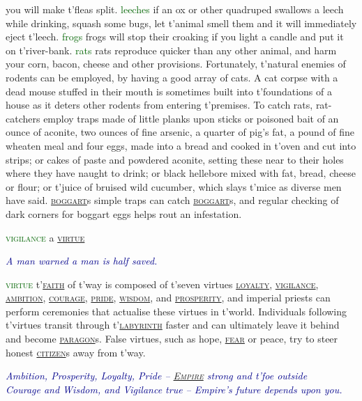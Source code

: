 \documentclass[twoside,11pt,b5paper,twocolumn]{scrbook}
\newcommand{\estcab}[1]{\textsc{\textcolor{marron}{#1}}}
\newcommand{\keyword}[1]{\textcolor{darkgreen}{#1}}
\renewcommand{\paragraph}[1]{\par\noindent\markboth{#1}{#1}\estcab{\keyword{#1}}\label{#1} }
\newcommand{\see}[1]{{\estcab{\hyperref[#1]{#1}}}}
\newcommand{\proverb}[1]{\par \textcolor{darkblue}{\itshape #1}}
\begin{document}
you will make t'fleas split. \keyword{leeches} if an ox or other quadruped swallows a leech while drinking, squash some bugs, let t'animal smell them and it will immediately eject t'leech. \keyword{frogs} frogs will stop their croaking if you light a candle and put it on t'river-bank. \keyword{rats} rats reproduce quicker than any other animal, and harm your corn, bacon, cheese and other provisions. Fortunately, t'natural enemies of rodents can be employed, by having a good array of cats. A cat corpse with a dead mouse stuffed in their mouth is sometimes built into t'foundations of a house as it deters other rodents from entering t'premises. To catch rats, rat-catchers employ traps made of little planks upon sticks or poisoned bait of an ounce of aconite, two ounces of fine arsenic, a quarter of pig's fat, a pound of fine wheaten meal and four eggs, made into a bread and cooked in t'oven and cut into strips; or cakes of paste and powdered aconite, setting these near to their holes where they have naught to drink; or black hellebore mixed with fat, bread, cheese or flour; or t'juice of bruised wild cucumber, which slays t'mice as diverse men have said. \see{boggart}s simple traps can catch \see{boggart}s, and regular checking of dark corners for boggart eggs helps rout an infestation.
\paragraph{vigilance} a \see{virtue} \proverb{A man warned a man is half saved.}
\paragraph{virtue} t'\see{faith} of t'way is composed of t'seven virtues \see{loyalty}, \see{vigilance}, \see{ambition}, \see{courage}, \see{pride}, \see{wisdom}, and \see{prosperity}, and imperial priests can perform ceremonies that actualise these virtues in t'world. Individuals following t'virtues transit through t'\see{labyrinth} faster and can ultimately leave it behind and become \see{paragon}s. False virtues, such as hope, \see{fear} or peace, try to steer honest \see{citizen}s away from t'way. \proverb{Ambition, Prosperity, Loyalty, Pride – \see{Empire} strong and t'foe outside\\Courage and Wisdom, and Vigilance true – Empire's future depends upon you.}
\end{document}
